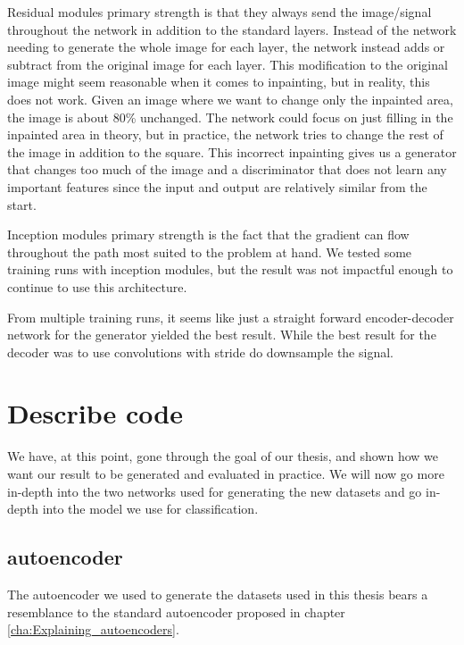 Residual modules primary strength is that they always send the image/signal throughout the network in addition to the standard layers. Instead of the network needing to generate the whole image for each layer, the network instead adds or subtract from the original image for each layer.
This modification to the original image might seem reasonable when it comes to inpainting, but in reality, this does not work.  Given an image where we want to change only the inpainted area, the image is about 80\% unchanged. The network could focus on just filling in the inpainted area in theory, but in practice, the network tries to change the rest of the image in addition to the square. This incorrect inpainting gives us a generator that changes too much of the image and a discriminator that does not learn any important features since the input and output are relatively similar from the start.

Inception modules primary strength is the fact that the gradient can flow throughout the path most suited to the problem at hand.
We tested some training runs with inception modules, but the result was not impactful enough to continue to use this architecture.

From multiple training runs, it seems like just a straight forward encoder-decoder network for the generator yielded the best result. While the best result for the decoder was to use convolutions with stride do downsample the signal.




\FloatBarrier
\section{Describe code}
We have, at this point, gone through the goal of our thesis, and shown how we want our result to be generated and evaluated in practice. 
We will now go more in-depth into the two networks used for generating the new datasets and go in-depth into the model we use for classification.


\subsection{autoencoder}
The autoencoder we used to generate the datasets used in this thesis bears a resemblance to the standard autoencoder proposed in chapter \ref{cha:Explaining_autoencoders}.

